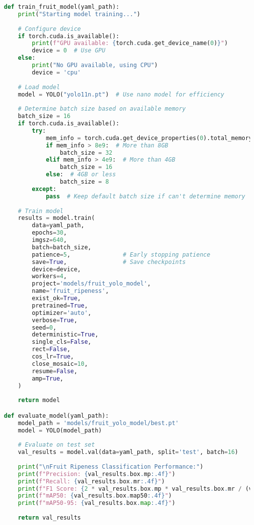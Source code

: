 \begin{lstlisting}[language=Python, caption={Fruit Ripeness Model Training and Evaluation}, label={lst:fruit-train-eval}]
def train_fruit_model(yaml_path):
    print("Starting model training...")
    
    # Configure device
    if torch.cuda.is_available():
        print(f"GPU available: {torch.cuda.get_device_name(0)}")
        device = 0  # Use GPU
    else:
        print("No GPU available, using CPU")
        device = 'cpu'
    
    # Load model
    model = YOLO("yolo11n.pt")  # Use nano model for efficiency
    
    # Determine batch size based on available memory
    batch_size = 16
    if torch.cuda.is_available():
        try:
            mem_info = torch.cuda.get_device_properties(0).total_memory
            if mem_info > 8e9:  # More than 8GB
                batch_size = 32
            elif mem_info > 4e9:  # More than 4GB
                batch_size = 16
            else:  # 4GB or less
                batch_size = 8
        except:
            pass  # Keep default batch size if can't determine memory
            
    # Train model
    results = model.train(
        data=yaml_path,
        epochs=30,               
        imgsz=640,               
        batch=batch_size,        
        patience=5,               # Early stopping patience
        save=True,                # Save checkpoints
        device=device,            
        workers=4,                
        project='models/fruit_yolo_model',
        name='fruit_ripeness',
        exist_ok=True,
        pretrained=True,
        optimizer='auto',
        verbose=True,
        seed=0,
        deterministic=True,
        single_cls=False,
        rect=False,
        cos_lr=True,
        close_mosaic=10,
        resume=False,
        amp=True,
    )
    
    return model

def evaluate_model(yaml_path):
    model_path = 'models/fruit_yolo_model/best.pt'
    model = YOLO(model_path)
    
    # Evaluate on test set
    val_results = model.val(data=yaml_path, split='test', batch=16)
    
    print("\nFruit Ripeness Classification Performance:")
    print(f"Precision: {val_results.box.mp:.4f}")
    print(f"Recall: {val_results.box.mr:.4f}")
    print(f"F1 Score: {2 * val_results.box.mp * val_results.box.mr / (val_results.box.mp + val_results.box.mr):.4f}")
    print(f"mAP50: {val_results.box.map50:.4f}")
    print(f"mAP50-95: {val_results.box.map:.4f}")
    
    return val_results
\end{lstlisting}

